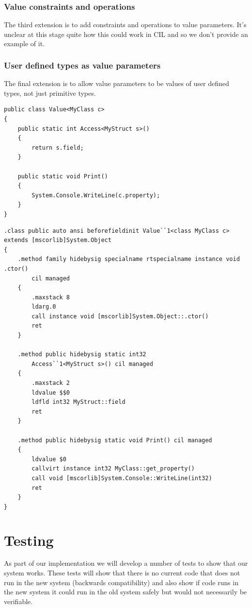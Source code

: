 \documentclass[english]{report}
\begin{document}
\subsection{Value constraints and operations}

The third extension is to add constraints and operations to value
parameters. It's unclear at this stage quite how this could work in
CIL and so we don't provide an example of it.


\subsection{User defined types as value parameters}

The final extension is to allow value parameters to be values of user
defined types, not just primitive types.

\begin{lstlisting}[caption={User defined types as value parameters in extended C\#},keywordstyle={\color{blue}},language=sharpc]
public class Value<MyClass c>
{
	public static int Access<MyStruct s>()
	{
		return s.field;
	}

	public static void Print()
	{
		System.Console.WriteLine(c.property);
	}
}
\end{lstlisting}


\begin{lstlisting}[caption={Corresponding CIL},language=cil]
.class public auto ansi beforefieldinit Value``1<class MyClass c>
extends [mscorlib]System.Object 
{
	.method family hidebysig specialname rtspecialname instance void .ctor() 
		cil managed
	{
		.maxstack 8
		ldarg.0
		call instance void [mscorlib]System.Object::.ctor()
		ret
	}

	.method public hidebysig static int32 
		Access``1<MyStruct s>() cil managed
	{
		.maxstack 2
		ldvalue $$0
		ldfld int32 MyStruct::field
		ret
	}

	.method public hidebysig static void Print() cil managed
	{
		ldvalue $0
		callvirt instance int32 MyClass::get_property()    
		call void [mscorlib]System.Console::WriteLine(int32)
		ret
	}
}
\end{lstlisting}

\chapter{Testing}

As part of our implementation we will develop a number of tests to show that
our system works. These tests will show that there is no current code that does
not run in the new system (backwards compatibility) and also show if code runs
in the new system it could run in the old system safely but would not
necessarily be verifiable.
\end{document}
